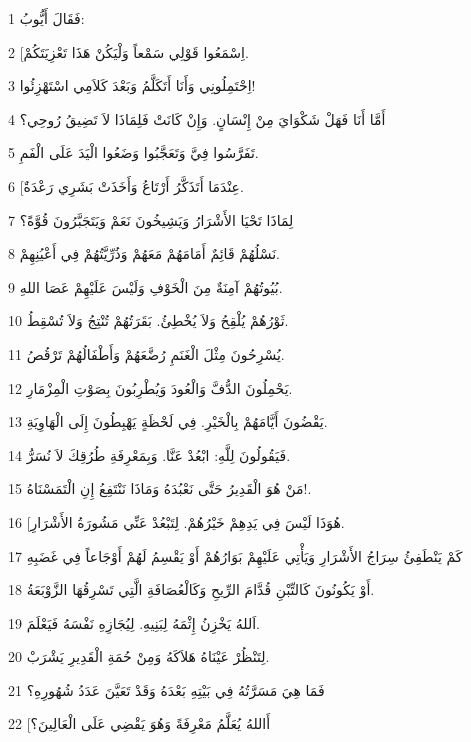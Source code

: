 \par 1 فَقَالَ أَيُّوبُ:
\par 2 [اِسْمَعُوا قَوْلِي سَمْعاً وَلْيَكُنْ هَذَا تَعْزِيَتَكُمْ.
\par 3 اِحْتَمِلُونِي وَأَنَا أَتَكَلَّمُ وَبَعْدَ كَلاَمِي اسْتَهْزِئُوا!
\par 4 أَمَّا أَنَا فَهَلْ شَكْوَايَ مِنْ إِنْسَانٍ. وَإِنْ كَانَتْ فَلِمَاذَا لاَ تَضِيقُ رُوحِي؟
\par 5 تَفَرَّسُوا فِيَّ وَتَعَجَّبُوا وَضَعُوا الْيَدَ عَلَى الْفَمِ.
\par 6 [عِنْدَمَا أَتَذَكَّرُ أَرْتَاعُ وَأَخَذَتْ بَشَرِي رَعْدَةٌ.
\par 7 لِمَاذَا تَحْيَا الأَشْرَارُ وَيَشِيخُونَ نَعَمْ وَيَتَجَبَّرُونَ قُوَّةً؟
\par 8 نَسْلُهُمْ قَائِمٌ أَمَامَهُمْ مَعَهُمْ وَذُرِّيَّتُهُمْ فِي أَعْيُنِهِمْ.
\par 9 بُيُوتُهُمْ آمِنَةٌ مِنَ الْخَوْفِ وَلَيْسَ عَلَيْهِمْ عَصَا اللهِ.
\par 10 ثَوْرُهُمْ يُلْقِحُ وَلاَ يُخْطِئُ. بَقَرَتُهُمْ تُنْتِجُ وَلاَ تُسْقِطُ.
\par 11 يُسْرِحُونَ مِثْلَ الْغَنَمِ رُضَّعَهُمْ وَأَطْفَالُهُمْ تَرْقُصُ.
\par 12 يَحْمِلُونَ الدُّفَّ وَالْعُودَ وَيُطْرِبُونَ بِصَوْتِ الْمِزْمَارِ.
\par 13 يَقْضُونَ أَيَّامَهُمْ بِالْخَيْرِ. فِي لَحْظَةٍ يَهْبِطُونَ إِلَى الْهَاوِيَةِ.
\par 14 فَيَقُولُونَ لِلَّهِ: ابْعُدْ عَنَّا. وَبِمَعْرِفَةِ طُرُقِكَ لاَ نُسَرُّ.
\par 15 مَنْ هُوَ الْقَدِيرُ حَتَّى نَعْبُدَهُ وَمَاذَا نَنْتَفِعُ إِنِ الْتَمَسْنَاهُ!.
\par 16 [هُوَذَا لَيْسَ فِي يَدِهِمْ خَيْرُهُمْ. لِتَبْعُدْ عَنِّي مَشُورَةُ الأَشْرَارِ.
\par 17 كَمْ يَنْطَفِئُ سِرَاجُ الأَشْرَارِ وَيَأْتِي عَلَيْهِمْ بَوَارُهُمْ أَوْ يَقْسِمُ لَهُمْ أَوْجَاعاً فِي غَضَبِهِ
\par 18 أَوْ يَكُونُونَ كَالتِّبْنِ قُدَّامَ الرِّيحِ وَكَالْعُصَافَةِ الَّتِي تَسْرِقُهَا الزَّوْبَعَةُ.
\par 19 اَللهُ يَخْزِنُ إِثْمَهُ لِبَنِيهِ. لِيُجَازِهِ نَفْسَهُ فَيَعْلَمَ.
\par 20 لِتَنْظُرْ عَيْنَاهُ هَلاَكَهُ وَمِنْ حُمَةِ الْقَدِيرِ يَشْرَبْ.
\par 21 فَمَا هِيَ مَسَرَّتُهُ فِي بَيْتِهِ بَعْدَهُ وَقَدْ تَعَيَّنَ عَدَدُ شُهُورِهِ؟
\par 22 [أَاللهُ يُعَلَّمُ مَعْرِفَةً وَهُوَ يَقْضِي عَلَى الْعَالِينَ؟
